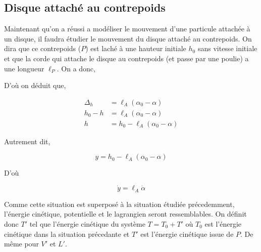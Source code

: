 \documentclass[10pt]{article}
\begin{document}
\pagebreak

\subsection{Disque attaché au contrepoids}

Maintenant qu'on a réussi a modéliser le mouvement d'une particule attachée à un disque, il faudra étudier le mouvement du disque
attaché au contrepoids. On dira que ce contrepoids ($P$) est laché à une hauteur initiale $h_0$ sans vitesse initiale et que la corde
qui attache le disque au contrepoids (et passe par une poulie) a une longueur $\ell_{P}$. On a donc,
\begin{center}
\end{center}

D'où on déduit que,

\begin{align*}
 \Delta_h &= \ell_A(\alpha_0-\alpha) \\
 h_0 - h &= \ell_A(\alpha_0-\alpha) \\
 h &= h_0 - \ell_A(\alpha_0-\alpha)
\end{align*}

Autrement dit,

\begin{equation}
 y = h_0 - \ell_A(\alpha_0-\alpha)
\end{equation}

D'où

$$ \dot{y} = \ell_A\dot{\alpha}$$

Comme cette situation est superposé à la situation étudiée précedemment, l'énergie cinétique, potentielle et le lagrangien seront
ressemblables. On définit donc $T'$ tel que l'énergie cinétique du système $T = T_0 + T'$ où $T_0$ est l'énergie cinétique
dans la situation précedante et $T'$ est l'énergie cinétique issue de $P$. De même pour $V'$ et $L'$.
\end{document}
